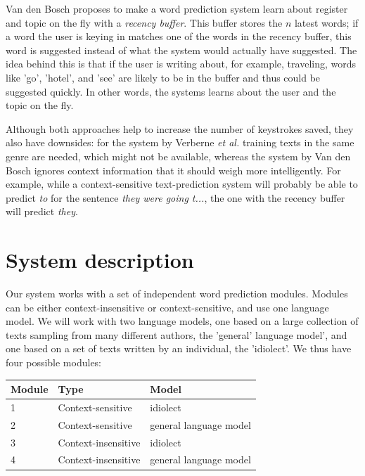 \documentclass[11pt]{article}
\let\originaltable\table
\let\endoriginaltable\endtable
\renewenvironment{table}[1][ht]{%
  \originaltable[#1]
  \centering}%
  {\endoriginaltable}
\begin{document}
Van den Bosch  proposes to make a word prediction system learn about register and topic on the fly with a \emph{recency buffer}. This buffer stores the $n$ latest words; if a word the user is keying in matches one of the words in the recency buffer, this word is suggested instead of what the system would actually have suggested. The idea behind this is that if the user is writing about, for example, traveling, words like 'go', 'hotel', and 'see' are likely to be in the buffer and thus could be suggested quickly. In other words, the systems learns about the user and the topic on the fly.

Although both approaches help to increase the number of keystrokes saved, they also have downsides: for the system by Verberne {\em et al.}  training texts in the same genre are needed, which might not be available, whereas the system by Van den Bosch  ignores context information that it should weigh more intelligently. For example, while a context-sensitive text-prediction system will probably be able to predict \emph{to} for the sentence \emph{they were going t...}, the one with the recency buffer will predict \emph{they}.


\section{System description} \label{algorithm}

Our system works with a set of independent word prediction modules. Modules can be either context-insensitive or context-sensitive, and use one language model. We will work with two language models, one based on a large collection of texts sampling from many different authors, the 'general' language model', and one based on a set of texts written by an individual, the 'idiolect'. We thus have four possible modules:

\begin{table}[htb]
\begin{tabular}{lll} 
Module&Type&Model\\
\hline
1& {\footnotesize Context-sensitive} & {\footnotesize idiolect}\\
2& {\footnotesize Context-sensitive} & {\footnotesize general language model} \\
3& {\footnotesize Context-insensitive} & {\footnotesize idiolect}\\ 
4& {\footnotesize Context-insensitive} & {\footnotesize general language model} \\
\end{tabular} 
\caption{Four possible modules: combinations of type and language model}
\end{table}
\end{document}
